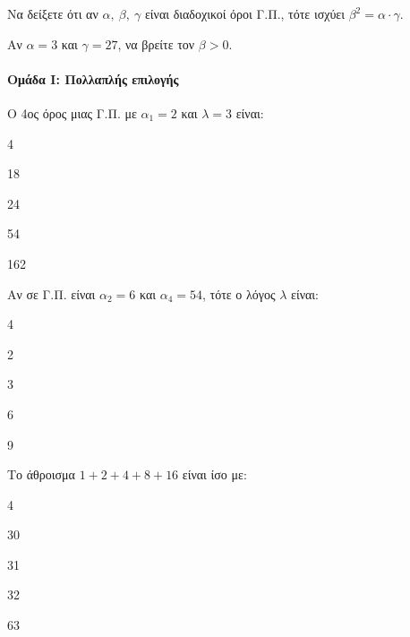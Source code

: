\documentclass[11pt,a4paper,modern]{FFExercises}
\begin{document}
\askhsh
\begin{alist}
  \item Να δείξετε ότι αν $\alpha,\ \beta,\ \gamma$ είναι διαδοχικοί όροι Γ.Π., τότε ισχύει $\beta^2 = \alpha \cdot \gamma$.
  \item Αν $\alpha = 3$ και $\gamma = 27$, να βρείτε τον $\beta > 0$.
\end{alist}


\paragraph{Ομάδα Ι: Πολλαπλής επιλογής}

\askhsh
Ο 4ος όρος μιας Γ.Π. με $\alpha_1 = 2$ και $\lambda = 3$ είναι:
\begin{multicols}{4}
\begin{alist}
  \item 18
  \item 24
  \item 54
  \item 162
\end{alist}
\end{multicols}

\askhsh
Αν σε Γ.Π. είναι $\alpha_2 = 6$ και $\alpha_4 = 54$, τότε ο λόγος $\lambda$ είναι:
\begin{multicols}{4}
\begin{alist}
  \item 2
  \item 3
  \item 6
  \item 9
\end{alist}
\end{multicols}

\askhsh
Το άθροισμα $1 + 2 + 4 + 8 + 16$ είναι ίσο με:
\begin{multicols}{4}
\begin{alist}
  \item 30
  \item 31
  \item 32
  \item 63
\end{alist}
\end{multicols}
\end{document}
